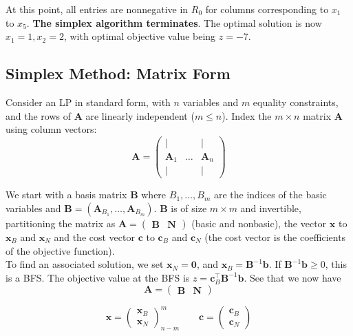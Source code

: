 \documentclass{article}
\begin{document}
\noindent At this point, all entries are nonnegative in $R_{0}$ for columns corresponding to $x_{1}$ to $x_{5}$. \textbf{The simplex algorithm terminates}. The optimal solution is now $x_{1} = 1, x_{2} = 2$, with optimal objective value being $z=-7$. 

\subsection{Simplex Method: Matrix Form}

Consider an LP in standard form, with $n$ variables and $m$ equality constraints, and the rows of $\mathbf{A}$ are linearly independent ($m \leq n$). Index the $m \times n$ matrix $ \mathbf{A}$ using column vectors: \begin{equation*}
    \mathbf{A} = \begin{pmatrix}
        | & & | \\ 
        \mathbf{A}_1 & \dots & \mathbf{A}_n \\ 
        | & & | 
    \end{pmatrix}
\end{equation*}

\noindent We start with a basis matrix $ \mathbf{B}$ where $B_{1}, \dots , B_m$ are the indices of the basic variables and $\mathbf{B} = (\mathbf{A}_{B_{1}}, \dots , \mathbf{A}_{B_m})$. $ \mathbf{B}$ is of size $m \times m $ and invertible, partitioning the matrix as $ \mathbf{A} = \begin{pmatrix}
    \mathbf{B} & \mathbf{N}
\end{pmatrix}$ (basic and nonbasic), the vector $\mathbf{x}$ to $\mathbf{x}_B$ and $\mathbf{x}_N$ and the cost vector $\mathbf{c}$ to $\mathbf{c}_B$ and $\mathbf{c}_N$ (the cost vector is the coefficients of the objective function). \\ 

\noindent To find an associated solution, we set $\mathbf{x}_N = \mathbf{0}$, and $\mathbf{x}_B = \mathbf{B}^{-1} \mathbf{b}$. If $\mathbf{B}^{-1} \mathbf{b} \geq 0$, this is a BFS. The objective value at the BFS is $z = \mathbf{c}^{\top}_B \mathbf{B}^{-1}\mathbf{b}$. See that we now have \begin{equation*}
    \mathbf{A} = \begin{pmatrix}
        \mathbf{B} & \mathbf{N}
    \end{pmatrix} 
\end{equation*}

\begin{equation*}
    \mathbf{x} = \begin{pmatrix}
        \mathbf{x}_B \\ 
        \mathbf{x}_N
    \end{pmatrix}^{m}_{n-m} \qquad \mathbf{c} = \begin{pmatrix}
        \mathbf{c}_B \\ 
        \mathbf{c}_N
    \end{pmatrix}
\end{equation*}
\end{document}
